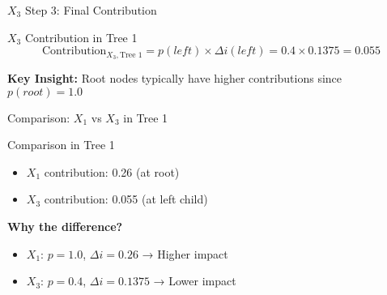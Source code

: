 \documentclass[10pt]{beamer}
\begin{document}
\begin{frame}{$X_3$ Step 3: Final Contribution}
\begin{examplebox}{$X_3$ Contribution in Tree 1}
$$\text{Contribution}_{X_3, \text{Tree 1}} = p(left) \times \Delta i(left) = 0.4 \times 0.1375 = 0.055$$
\end{examplebox}

\begin{alertbox}
\textbf{Key Insight:} Root nodes typically have higher contributions since $p(root) = 1.0$
\end{alertbox}
\end{frame}

\begin{frame}{Comparison: $X_1$ vs $X_3$ in Tree 1}
\begin{keypointsbox}{Comparison in Tree 1}
\begin{itemize}
\item $X_1$ contribution: 0.26 (at root)
\item $X_3$ contribution: 0.055 (at left child)
\end{itemize}
\end{keypointsbox}

\begin{examplebox}
\textbf{Why the difference?}
\begin{itemize}
\item $X_1$: $p = 1.0$, $\Delta i = 0.26$ → Higher impact
\item $X_3$: $p = 0.4$, $\Delta i = 0.1375$ → Lower impact
\end{itemize}
\end{examplebox}
\end{frame}
\end{document}
